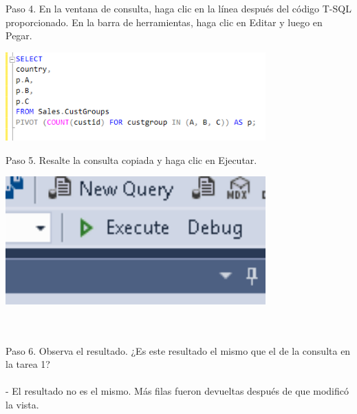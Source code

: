 \begin{flushleft}
Paso 4. En la ventana de consulta, haga clic en la línea después del código T-SQL proporcionado. En la barra de herramientas, haga clic en Editar y luego en Pegar.
\begin{center}
	\includegraphics[width=10cm]{./Imagenes/2img4} 
	\end{center}

Paso 5. Resalte la consulta copiada y haga clic en Ejecutar.
\begin{center}
	\includegraphics[width=10cm]{./Imagenes/2img5} 
	\end{center}
\textbf{}\\
\textbf{}\\

Paso 6. Observa el resultado. ¿Es este resultado el mismo que el de la consulta en la tarea 1?\\
\textbf{}\\
- El resultado no es el mismo. Más filas fueron devueltas después de que modificó la vista.
\textbf{}\\
\textbf{}\\


\end{flushleft}
